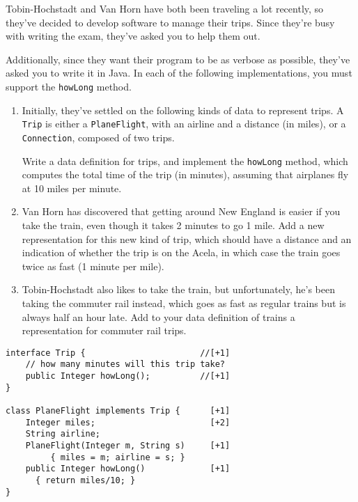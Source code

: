 \documentclass[12pt]{article}                   %
\def\pts#1{\marginpar{\footnotesize \raggedright  \fbox{#1 {\sc Points}}}}
\newenvironment{solution}{}{}
\begin{document}
\begin{problem}\pts{22}

Tobin-Hochstadt and Van Horn have both been traveling a lot recently,
so they've decided to develop software to manage their trips.  Since
they're busy with writing the exam, they've asked you to help them
out. 

Additionally, since they want their program to be as verbose as
possible, they've asked you to write it in Java.  
%
In each of the following implementations, you must support the
\verb|howLong| method.

\begin{enumerate}
\item
Initially, they've settled on the following kinds of data to represent
trips.  A {\tt Trip} is either a {\tt PlaneFlight}, with an airline
and a distance (in miles), or a {\tt Connection}, composed of two trips.  

Write a data definition for trips, and implement the {\tt howLong}
method, which computes the total time of the trip (in minutes),
assuming that airplanes fly at 10 miles per minute.

\newpage
\item
Van Horn has discovered that getting around New England is easier if
you take the train, even though it takes 2 minutes to go 1 mile.  Add a new representation for this new kind of
trip, which should have a distance and an indication of whether the trip
is on the Acela, in which case the train goes twice as fast (1 minute
per mile).

\newpage
\item Tobin-Hochstadt also likes to take the train, but unfortunately,
  he's been taking the commuter rail instead, which goes as fast as
  regular trains but is always half an hour late.  Add to your data
  definition of trains a representation for commuter rail trips.  
\end{enumerate}


\newpage
\ifrubric{}
\newpage
\fi

\begin{solution}
\begin{verbatim}
interface Trip {                       //[+1]
    // how many minutes will this trip take? 
    public Integer howLong();          //[+1]
}

class PlaneFlight implements Trip {      [+1]
    Integer miles;                       [+2]
    String airline;
    PlaneFlight(Integer m, String s)     [+1]
         { miles = m; airline = s; }   
    public Integer howLong()             [+1]
      { return miles/10; }
}


\end{verbatim}
\end{solution}
\end{problem}
\end{document}
